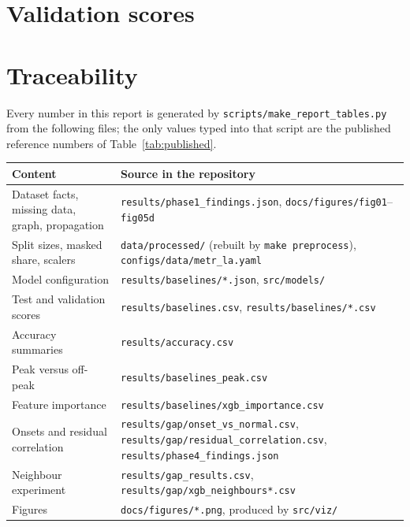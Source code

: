 \documentclass[11pt,a4paper]{article}
\begin{document}
\section{Validation scores}\label{app:val}
\begin{table}[ht]
\centering\footnotesize\setlength{\tabcolsep}{3.5pt}
\caption{Validation scores in the same layout as Table~\ref{tab:test}. The validation block was used only to choose settings and for early stopping.}
\end{table}

\clearpage
\section{Traceability}
Every number in this report is generated by \texttt{scripts/make\_report\_tables.py} from the following files; the only values typed into that script are the published reference numbers of Table~\ref{tab:published}.
\begin{center}\small
\begin{tabularx}{\textwidth}{@{}lX@{}}
\toprule
Content & Source in the repository \\
\midrule
Dataset facts, missing data, graph, propagation & \texttt{results/phase1\_findings.json}, \texttt{docs/figures/fig01}--\texttt{fig05d} \\
Split sizes, masked share, scalers & \texttt{data/processed/} (rebuilt by \texttt{make preprocess}), \texttt{configs/data/metr\_la.yaml} \\
Model configuration & \texttt{results/baselines/*.json}, \texttt{src/models/} \\
Test and validation scores & \texttt{results/baselines.csv}, \texttt{results/baselines/*.csv} \\
Accuracy summaries & \texttt{results/accuracy.csv} \\
Peak versus off-peak & \texttt{results/baselines\_peak.csv} \\
Feature importance & \texttt{results/baselines/xgb\_importance.csv} \\
Onsets and residual correlation & \texttt{results/gap/onset\_vs\_normal.csv}, \texttt{results/gap/residual\_correlation.csv}, \texttt{results/phase4\_findings.json} \\
Neighbour experiment & \texttt{results/gap\_results.csv}, \texttt{results/gap/xgb\_neighbours*.csv} \\
Figures & \texttt{docs/figures/*.png}, produced by \texttt{src/viz/} \\
\bottomrule
\end{tabularx}
\end{center}
\end{document}

